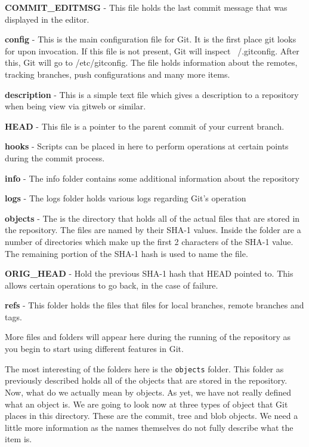 \textbf{COMMIT\_EDITMSG} - This file holds the last commit message that was displayed in the editor.

\textbf{config} - This is the main configuration file for Git.  It is the first place git looks for upon invocation.  If this file is not present, Git will inspect ~/.gitconfig.  After this, Git will go to /etc/gitconfig.  The file holds information about the remotes, tracking branches, push configurations and many more items.

\textbf{description} - This is a simple text file which gives a description to a repository when being view via gitweb or similar.

\textbf{HEAD} - This file is a pointer to the parent commit of your current branch.

\textbf{hooks} - Scripts can be placed in here to perform operations at certain points during the commit process.

\textbf{info} - The info folder contains some additional information about the repository

\textbf{logs} - The logs folder holds various logs regarding Git's operation

\textbf{objects} - The is the directory that holds all of the actual files that are stored in the repository.  The files are named by their SHA-1 values.  Inside the folder are a number of directories which make up the first 2 characters of the SHA-1 value.  The remaining portion of the SHA-1 hash is used to name the file.

\textbf{ORIG\_HEAD} - Hold the previous SHA-1 hash that HEAD pointed to.  This allows certain operations to go back, in the case of failure.

\textbf{refs} - This folder holds the files that files for local branches, remote branches and tags.

More files and folders will appear here during the running of the repository as you begin to start using different features in Git.

The most interesting of the folders here is the \texttt{objects} folder.  This folder as previously described holds all of the objects that are stored in the repository.  Now, what do we actually mean by objects.  As yet, we have not really defined what an object is.  We are going to look now at three types of object that Git places in this directory.  These are the commit, tree and blob objects.  We need a little more information as the names themselves do not fully describe what the item is.

